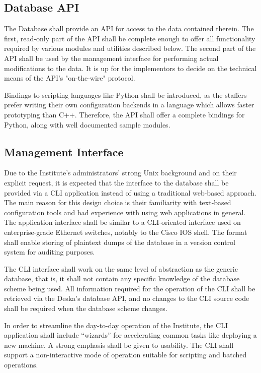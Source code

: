 \documentclass{article}
\begin{document}
\subsection{Database API}

The Database shall provide an API for access to the data contained therein.  The first, read-only part of the API shall be
complete enough to offer all functionality required by various modules and utilities described below.  The second part of the API
shall be used by the management interface for performing actual modifications to the data.  It is up for the implementors to
decide on the technical means of the API's "on-the-wire" protocol.

Bindings to scripting languages like Python shall be introduced, as the staffers prefer writing their own configuration backends
in a language which allows faster prototyping than C++.  Therefore, the API shall offer a complete bindings for Python, along with
well documented sample modules.

\subsection{Management Interface}

Due to the Institute's administrators' strong Unix background and on their explicit request, it is expected that the interface to
the database shall be provided via a CLI application instead of using a traditional web-based approach.  The main reason for this
design choice is their familiarity with text-based configuration tools and bad experience with using web applications in general.
The application interface shall be similar to a CLI-oriented interface used on enterprise-grade Ethernet switches, notably to the
Cisco IOS shell.  The format shall enable storing of plaintext dumps of the database in a version control system for auditing
purposes.

The CLI interface shall work on the same level of abstraction as the generic database, that is, it shall not contain any specific
knowledge of the database scheme being used.  All information required for the operation of the CLI shall be retrieved via the
Deska's database API, and no changes to the CLI source code shall be required when the database scheme changes.

In order to streamline the day-to-day operation of the Institute, the CLI application shall include ``wizards'' for accelerating
common tasks like deploying a new machine.  A strong emphasis shall be given to usability.  The CLI shall support a
non-interactive mode of operation suitable for scripting and batched operations.
\end{document}
